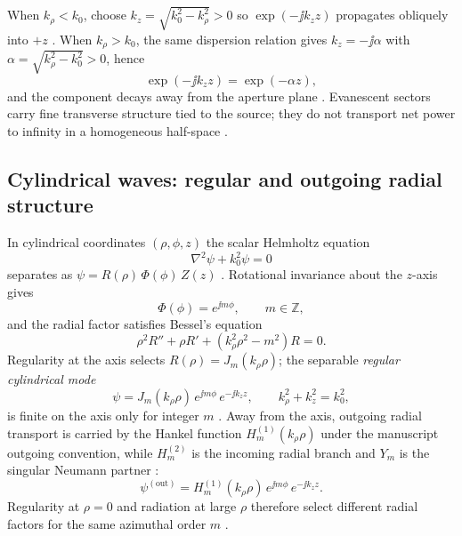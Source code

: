 When $k_\rho<k_0$, choose $k_z=\sqrt{k_0^2-k_\rho^2}>0$ so $\exp(-\jj k_z z)$ propagates obliquely into $+z$ \cite{stratton1941}. When $k_\rho>k_0$, the same dispersion relation gives $k_z=-\jj\alpha$ with $\alpha=\sqrt{k_\rho^2-k_0^2}>0$, hence
\begin{equation}
\label{eq:ch1.evanescent-decay}
\exp(-\jj k_z z)=\exp(-\alpha z),
\end{equation}
and the component decays away from the aperture plane \cite{stratton1941,felsen1994}. Evanescent sectors carry fine transverse structure tied to the source; they do not transport net power to infinity in a homogeneous half-space \cite{stratton1941}.


\subsection{Cylindrical waves: regular and outgoing radial structure}
\label{sec:ch01.2.7}

In cylindrical coordinates $(\rho,\phi,z)$ the scalar Helmholtz equation
\begin{equation}
\label{eq:ch1.scalar-helmholtz-cyl}
\nabla^2\psi+k_0^2\psi=0
\end{equation}
separates as $\psi=R(\rho)\,\Phi(\phi)\,Z(z)$ \cite{stratton1941,harrington2001}. Rotational invariance about the $z$-axis gives
\begin{equation}
\label{eq:ch1.cyl-phi-separation}
\Phi(\phi)=e^{\jj m\phi},\qquad m\in\mathbb{Z},
\end{equation}
and the radial factor satisfies Bessel's equation
\begin{equation}
\label{eq:ch1.bessel-equation}
\rho^2 R''+\rho R'+(k_\rho^2\rho^2-m^2)R=0.
\end{equation}
Regularity at the axis selects $R(\rho)=J_m(k_\rho\rho)$; the separable \emph{regular cylindrical mode}
\begin{equation}
\label{eq:ch1.cylindrical-mode-regular}
\psi=J_m(k_\rho\rho)\,e^{\jj m\phi}\,e^{-\jj k_z z},
\qquad k_\rho^2+k_z^2=k_0^2,
\end{equation}
is finite on the axis only for integer $m$ \cite{stratton1941}. Away from the axis, outgoing radial transport is carried by the Hankel function $H_m^{(1)}(k_\rho\rho)$ under the manuscript outgoing convention, while $H_m^{(2)}$ is the incoming radial branch and $Y_m$ is the singular Neumann partner \cite{stratton1941,harrington2001}:
\begin{equation}
\label{eq:ch1.cylindrical-mode-outgoing}
\psi^{(\mathrm{out})}=H_m^{(1)}(k_\rho\rho)\,e^{\jj m\phi}\,e^{-\jj k_z z}.
\end{equation}
Regularity at $\rho=0$ and radiation at large $\rho$ therefore select different radial factors for the same azimuthal order $m$ \cite{stratton1941}.

